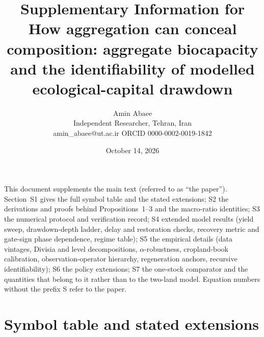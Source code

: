 \documentclass[11pt,a4paper]{article}
\title{Supplementary Information for\\[4pt]
\large How aggregation can conceal composition: aggregate biocapacity and the identifiability of modelled ecological-capital drawdown}
\author{Amin Abaee\\ \small Independent Researcher, Tehran, Iran\\ \small amin\_abaee@ut.ac.ir \quad ORCID 0000-0002-0019-1842}
\date{October 14, 2026}
\begin{document}
\maketitle

\noindent This document supplements the main text (referred to as ``the paper''). Section~S1 gives the full symbol table and the stated extensions; S2 the derivations and proofs behind Propositions~1--3 and the macro-ratio identities; S3 the numerical protocol and verification record; S4 extended model results (yield sweep, drawdown-depth ladder, delay and restoration checks, recovery metric and gate-sign phase dependence, regime table); S5 the empirical details (data vintages, Divisia and level decompositions, $\alpha$-robustness, cropland-book calibration, observation-operator hierarchy, regeneration anchors, recursive identifiability); S6 the policy extensions; S7 the one-stock comparator and the quantities that belong to it rather than to the two-land model. Equation numbers without the prefix S refer to the paper.

\tableofcontents

\section{Symbol table and stated extensions}\label{si:symbols}
\end{document}
